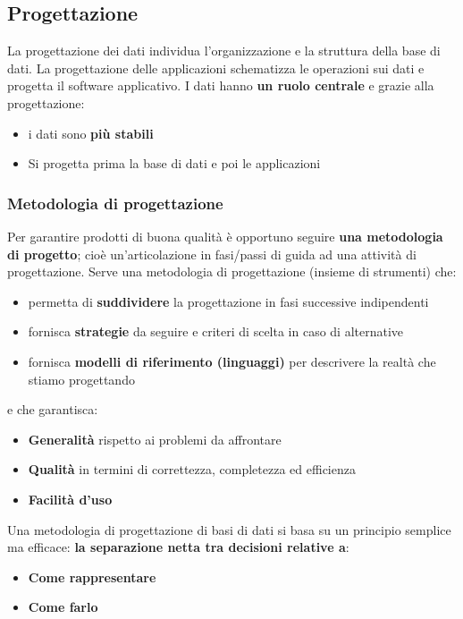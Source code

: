 \documentclass[12pt]{article}
\begin{document}
\subsection{Progettazione}
La progettazione dei dati individua l'organizzazione e la struttura della base di dati.
La progettazione delle applicazioni schematizza le operazioni sui dati e progetta il software applicativo.
I dati hanno \textbf{un ruolo centrale} e grazie alla progettazione:
\begin{itemize}
    \item i dati sono \textbf{più stabili}
    \item Si progetta prima la base di dati e poi le applicazioni
\end{itemize}
\subsubsection{Metodologia di progettazione}
Per garantire prodotti di buona qualità è opportuno seguire \textbf{una metodologia di progetto}; cioè un'articolazione in fasi/passi di guida ad una attività di progettazione.
Serve una metodologia di progettazione (insieme di strumenti) che:
\begin{itemize}
    \item permetta di \textbf{suddividere} la progettazione in fasi successive indipendenti
    \item fornisca \textbf{strategie} da seguire e criteri di scelta in caso di alternative
    \item fornisca \textbf{modelli di riferimento (linguaggi)} per descrivere la realtà che stiamo progettando
\end{itemize}
e che garantisca:
\begin{itemize}
    \item \textbf{Generalità} rispetto ai problemi da affrontare
    \item \textbf{Qualità} in termini di correttezza, completezza ed efficienza
    \item \textbf{Facilità d'uso}
\end{itemize}
Una metodologia di progettazione di basi di dati si basa su un principio semplice ma efficace:
\textbf{la separazione netta tra decisioni relative a}:
\begin{itemize}
    \item \textbf{Come rappresentare}
    \item \textbf{Come farlo}
\end{itemize}
\end{document}
